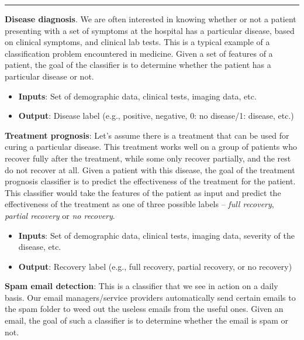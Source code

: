 \begin{boxedstuff}
    \vspace{4mm}
    \hrule
    \begin{example}
        \textbf{Disease diagnosis}. We are often interested in knowing whether or not a patient presenting with a set of symptoms at the hospital has a particular disease, based on clinical symptoms, and clinical lab tests. This is a typical example of a classification problem encountered in medicine. Given a set of features of a patient, the goal of the classifier is to determine whether the patient has a particular disease or not.
        \begin{itemize}
            \item \textbf{Inputs}: Set of demographic data, clinical tests, imaging data, etc.
            \item \textbf{Output}: Disease label (e.g., positive, negative, 0: no disease/1: disease, etc.)
        \end{itemize}
    \end{example}
    \begin{example}
        \textbf{Treatment prognosis}: Let's assume there is a treatment that can be used for curing a particular disease. This treatment works well on a group of patients who recover fully after the treatment, while some only recover partially, and the rest do not recover at all. Given a patient with this disease, the goal of the treatment prognosis classifier is to predict the effectiveness of the treatment for the patient. This classifier would take the features of the patient as input and predict the effectiveness of the treatment as one of three possible labels -- \textit{full recovery}, \textit{partial recovery} or \textit{no recovery}.
        \begin{itemize}
            \item \textbf{Inputs}: Set of demographic data, clinical tests, imaging data, severity of the disease, etc.
            \item \textbf{Output}: Recovery label (e.g., full recovery, partial recovery, or no recovery)
        \end{itemize}
    \end{example}
    \begin{example}
        \textbf{Spam email detection}: This is a classifier that we see in action on a daily basis. Our email managers/service providers automatically send certain emails to the spam folder to weed out the useless emails from the useful ones. Given an email, the goal of such a classifier is to determine whether the email is spam or not.

\end{example}
\end{boxedstuff}

